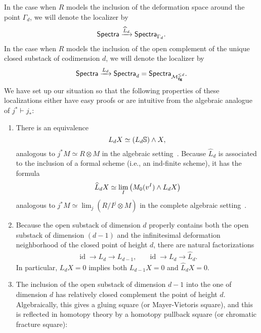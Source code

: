 In the case when $R$ models the inclusion of the deformation space around the point $\Gamma_d$, we will denote the localizer by \[\mathsf{Spectra} \xrightarrow{\widehat L_d} \mathsf{Spectra}_{\Gamma_d}.\]  In the case when $R$ models the inclusion of the open complement of the unique closed substack of codimension $d$, we will denote the localizer by \[\mathsf{Spectra} \xrightarrow{L_d} \mathsf{Spectra}_d = \mathsf{Spectra}_{\mathcal{M}_{\mathbf{fg}}^{\le d}}.\]  We have set up our situation so that the following properties of these localizations either have easy proofs or are intuitive from the algebraic analogue of $j^* \vdash j_*$:
\begin{enumerate}
\item There is an equivalence \[L_d X \simeq (L_d \mathbb S) \wedge X,\] analogous to $j^* M \simeq R \otimes M$ in the algebraic setting~\cite[Theorem 7.5.6]{RavenelOrangeBook}.  Because $\widehat L_d$ is associated to the inclusion of a formal scheme (i.e., an ind-finite scheme), it has the formula \[\widehat L_d X \simeq \lim_I \left( M_0(v^I) \wedge L_d X \right)\] analogous to $j^* M \simeq \lim_j (R/I^j \otimes M)$ in the complete algebraic setting~\cite[Proof of Lemma 2.3]{HoveyCSC}.
\item Because the open substack of dimension $d$ properly contains both the open substack of dimension $(d-1)$ and the infinitesimal deformation neighborhood of the closed point of height $d$, there are natural factorizations
\begin{align*}
\operatorname{id} \to L_d \to L_{d-1}, & & \operatorname{id} \to L_d \to \widehat L_d.
\end{align*}
In particular, $L_d X = 0$ implies both $L_{d-1} X = 0$ and $\widehat L_d X = 0$.
\item The inclusion of the open substack of dimension $d-1$ into the one of dimension $d$ has relatively closed complement the point of height $d$.  Algebraically, this gives a gluing square (or Mayer-Vietoris square), and this is reflected in homotopy theory by a homotopy pullback square (or chromatic fracture square): 
\begin{center}
\end{center}
\end{enumerate}

